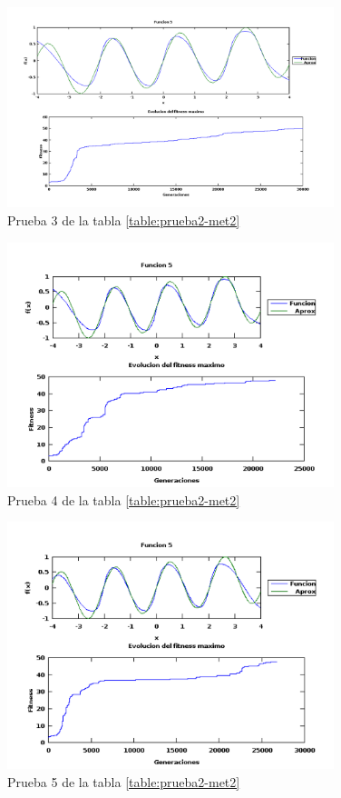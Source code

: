 \documentclass[11pt,a4paper]{article}
\begin{document}
\begin{figure}[h]
\centering
\includegraphics[width=0.85\textwidth]{img/9.png}
\caption{\label{fig:9} Prueba 3 de la tabla \ref{table:prueba2-met2}}
\end{figure}

\begin{figure}[h]
\centering
\includegraphics[width=0.85\textwidth]{img/5.png}
\caption{\label{fig:5} Prueba 4 de la tabla \ref{table:prueba2-met2}}
\end{figure}

\begin{figure}[h]
\centering
\includegraphics[width=0.85\textwidth]{img/59.png}
\caption{\label{fig:59} Prueba 5 de la tabla \ref{table:prueba2-met2}}
\end{figure}
\end{document}
